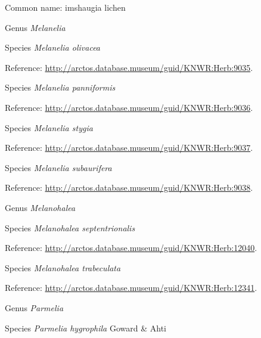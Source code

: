 \documentclass[9pt, article]{memoir}
\begin{document}
\begin{multicols}{2}
Common name: imshaugia lichen

\vspace{6pt}\noindent\hspace{30pt}Genus \textit{Melanelia}


\vspace{6pt}\noindent\hspace{36pt}Species \textit{Melanelia olivacea}


Reference: 
\url{http://arctos.database.museum/guid/KNWR:Herb:9035}.

\vspace{6pt}\noindent\hspace{36pt}Species \textit{Melanelia panniformis}


Reference: 
\url{http://arctos.database.museum/guid/KNWR:Herb:9036}.

\vspace{6pt}\noindent\hspace{36pt}Species \textit{Melanelia stygia}


Reference: 
\url{http://arctos.database.museum/guid/KNWR:Herb:9037}.

\vspace{6pt}\noindent\hspace{36pt}Species \textit{Melanelia subaurifera}


Reference: 
\url{http://arctos.database.museum/guid/KNWR:Herb:9038}.

\vspace{6pt}\noindent\hspace{30pt}Genus \textit{Melanohalea}


\vspace{6pt}\noindent\hspace{36pt}Species \textit{Melanohalea septentrionalis}


Reference: 
\url{http://arctos.database.museum/guid/KNWR:Herb:12040}.

\vspace{6pt}\noindent\hspace{36pt}Species \textit{Melanohalea trabeculata}


Reference: 
\url{http://arctos.database.museum/guid/KNWR:Herb:12341}.

\vspace{6pt}\noindent\hspace{30pt}Genus \textit{Parmelia}


\vspace{6pt}\noindent\hspace{36pt}Species \textit{Parmelia hygrophila} Goward \& Ahti



\end{multicols}
\end{document}
